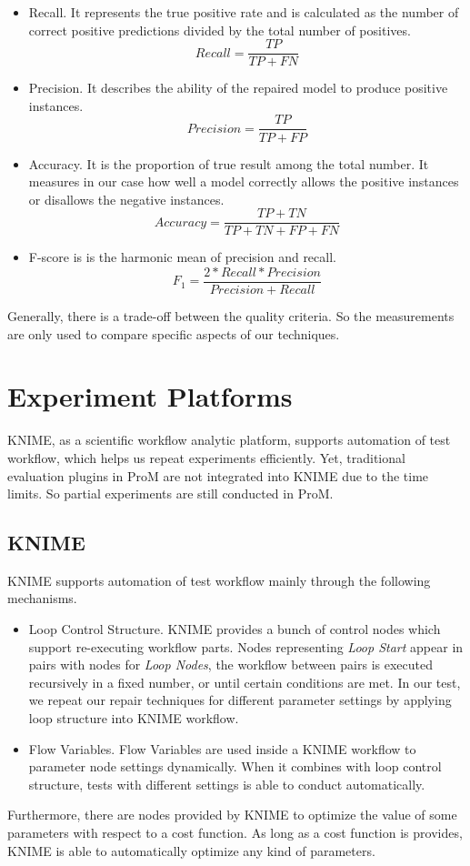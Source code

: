 \begin{itemize}
	\item Recall. It represents the true positive rate and is calculated as the number of correct positive predictions divided by the total number of positives.
	\[Recall = \frac{TP}{TP + FN}\]
	\item Precision. It describes the ability of the repaired model to produce positive instances.
	\[Precision = \frac{TP}{TP + FP }\]
	\item Accuracy. It is the proportion of true result among the total number. It  measures in our case how well a model correctly allows the positive instances or disallows the negative instances.
	\[Accuracy = \frac{TP+TN}{TP+TN+FP+FN}\]
	\item F-score is is the harmonic mean of precision and recall.
	\[F_1 = \frac{2*Recall*Precision}{Precision + Recall}\]
\end{itemize}
Generally, there is a trade-off between the quality criteria. So the measurements are only used to compare specific aspects of our techniques.
\section{Experiment Platforms}
KNIME, as a scientific workflow analytic platform, supports automation of test workflow, which helps us repeat experiments efficiently. Yet, traditional evaluation plugins in ProM are not integrated into KNIME due to the time limits. So partial experiments are still conducted in ProM.
\subsection{KNIME}
KNIME supports automation of test workflow mainly through the following mechanisms. 
\begin{itemize}
	\item Loop Control Structure. KNIME provides a bunch of control nodes which support re-executing workflow parts.  Nodes representing \emph{Loop Start} appear in pairs with nodes for \emph{Loop Nodes}, the workflow between pairs is executed recursively in a fixed number, or until certain conditions are met. In our test, we repeat our repair techniques for different parameter settings by applying loop structure into KNIME workflow.
	\item Flow Variables. Flow Variables are used inside a KNIME workflow to parameter node settings dynamically. When it combines with loop control structure, tests with different settings is able to conduct automatically.
\end{itemize}
Furthermore, there are nodes provided by KNIME to optimize the value of some parameters with respect to a cost function. As long as a cost function is provides, KNIME is able to automatically optimize any kind of parameters. 

